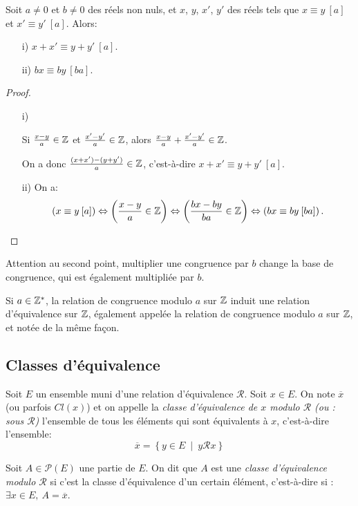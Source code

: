 \begin{proposition} Soit $a\neq 0$ et $b\neq 0$ des réels non nuls, et $x$, $y$, $x'$, $y'$ des réels tels que $x \equiv y\: [a]$ et $x' \equiv y'\: [a]$. Alors:
\begin{itemize}
\item[i)]{$x+x' \equiv y+y'\: [a]$.}
\item[ii)]{$bx\equiv by \: [ba]$.}
\end{itemize}
\end{proposition}
\begin{proof}
\begin{itemize}
\item[i)]{Si $\frac{x-y}{a} \in \mathbb{Z}$ et $\frac{x'-y'}{a} \in \mathbb{Z}$, alors $\frac{x-y}{a}+\frac{x'-y'}{a} \in \mathbb{Z}$.

On a donc $\frac{(x+x')-(y+y')}{a} \in \mathbb{Z}$, c'est-à-dire $x+x' \equiv y+y'\: [a]$.}
\item[ii)]{On a:
\[\left(x\equiv y \: [a]\right) \Leftrightarrow  \left(\frac{x-y}{a} \in \mathbb{Z}\right) \Leftrightarrow \left(\frac{bx-by}{ba} \in \mathbb{Z}\right) \Leftrightarrow \left(bx\equiv by \: [ba]\right).\]}
\end{itemize}
\end{proof}

\begin{remarque}
Attention au second point, multiplier une congruence par $b$ change la base de congruence, qui est également multipliée par $b$.
\end{remarque}

\begin{definition}
Si $a\in \mathbb{Z}^*$, la relation de congruence modulo $a$ sur $\mathbb{Z}$ induit une relation d'équivalence sur $\mathbb{Z}$, également appelée la relation de congruence modulo $a$ sur $\mathbb{Z}$, et notée de la même façon.
\end{definition}

\subsection{Classes d'équivalence}
\begin{definition}
Soit $E$ un ensemble muni d'une relation d'équivalence ${\mathcal R}$. Soit $x\in E$. On note $\overline{x}$ (ou parfois $Cl(x)$) et on appelle la \emph{classe d'équivalence de $x$ modulo $\mathcal R$ (ou : sous $\mathcal R$)} l'ensemble  de tous les éléments qui sont équivalents à $x$, c'est-à-dire l'ensemble:
\[
\overline x = \left\{y\in E\:\mid\: y{\mathcal R}x\right\}
\]


Soit $A\in \mathcal P(E)$ une partie de $E$. On dit que $A$ est une \emph{classe d'équivalence modulo $\mathcal R$} si c'est la classe d'équivalence d'un certain élément, c'est-à-dire si : $\exists x\in E, \: A=\overline x$.
\end{definition}


